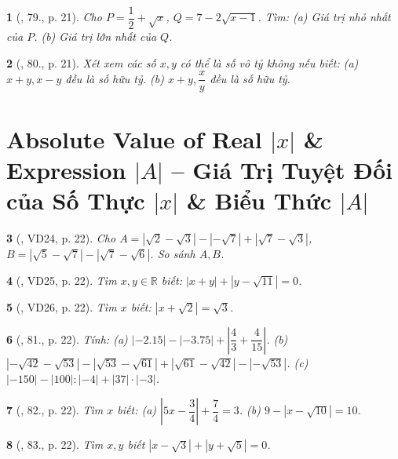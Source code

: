 \documentclass{article}
\newtheorem{baitoan}{}
\begin{document}
\begin{baitoan}[\cite{Tuyen_Toan_7}, 79., p. 21]
	Cho $P = \dfrac{1}{2} + \sqrt{x}$, $Q = 7 - 2\sqrt{x - 1}$. Tìm: (a) Giá trị nhỏ nhất của $P$. (b) Giá trị lớn nhất của $Q$.
\end{baitoan}

\begin{baitoan}[\cite{Tuyen_Toan_7}, 80., p. 21]
	Xét xem các số $x,y$ có thể là số vô tỷ không nếu biết: (a) $x + y,x - y$ đều là số hữu tỷ. (b) $x + y,\dfrac{x}{y}$ đều là số hữu tỷ.
\end{baitoan}


\section{Absolute Value of Real $|x|$ \& Expression $|A|$ -- Giá Trị Tuyệt Đối của  Số Thực $|x|$ \& Biểu Thức $|A|$}

\begin{baitoan}[\cite{Tuyen_Toan_7}, VD24, p. 22]
	Cho $A = |\sqrt{2} - \sqrt{3}| - |-\sqrt{7}| + |\sqrt{7} - \sqrt{3}|$, $B = |\sqrt{5} - \sqrt{7}| - |\sqrt{7} - \sqrt{6}|$. So sánh $A,B$.
\end{baitoan}	

\begin{baitoan}[\cite{Tuyen_Toan_7}, VD25, p. 22]
	Tìm $x,y\in\mathbb{R}$ biết: $|x + y| + |y - \sqrt{11}| = 0$.
\end{baitoan}

\begin{baitoan}[\cite{Tuyen_Toan_7}, VD26, p. 22]
	Tìm $x$ biết: $|x + \sqrt{2}| = \sqrt{3}$.
\end{baitoan}

\begin{baitoan}[\cite{Tuyen_Toan_7}, 81., p. 22]
	Tính: (a) $|-2.15| - |-3.75| + \left|\dfrac{4}{3} + \dfrac{4}{15}\right|$. (b) $|-\sqrt{42} - \sqrt{53}| - |\sqrt{53} - \sqrt{61}| + |\sqrt{61} - \sqrt{42}| - |-\sqrt{53}|$. (c) $|-150| - |100|:|-4| + |37|\cdot|-3|$.
\end{baitoan}

\begin{baitoan}[\cite{Tuyen_Toan_7}, 82., p. 22]
	Tìm $x$ biết: (a) $\left|5x - \dfrac{3}{4}\right| + \dfrac{7}{4} = 3$. (b) $9 - |x - \sqrt{10}| = 10$.
\end{baitoan}

\begin{baitoan}[\cite{Tuyen_Toan_7}, 83., p. 22]
	Tìm $x,y$ biết $|x - \sqrt{3}| + |y + \sqrt{5}| = 0$.
\end{baitoan}
\end{document}
